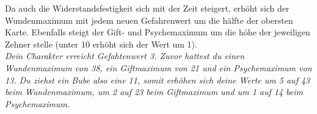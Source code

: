 Da auch die Widerstandsfestigkeit sich mit der Zeit steigert, erhöht sich der Wundenmaximum mit jedem neuen Gefahrenwert um die hälfte der obersten Karte. Ebenfalls steigt der Gift- und Psychemaximum um die höhe der jeweiligen Zehner stelle (unter 10 erhöht sich der Wert um 1).\\
\textit{Dein Charakter erreicht Gefahtenwert 3. Zuvor hattest du einen Wundenmaximum von 38, ein Giftmaximum von 21 und ein Psychemaximum von 13. Du ziehst ein Bube also eine 11, somit erhöhen sich deine Werte um 5 auf 43 beim  Wundenmaximum, um 2 auf 23 beim Giftmaximum und um 1 auf 14 beim Psychemaximum.}